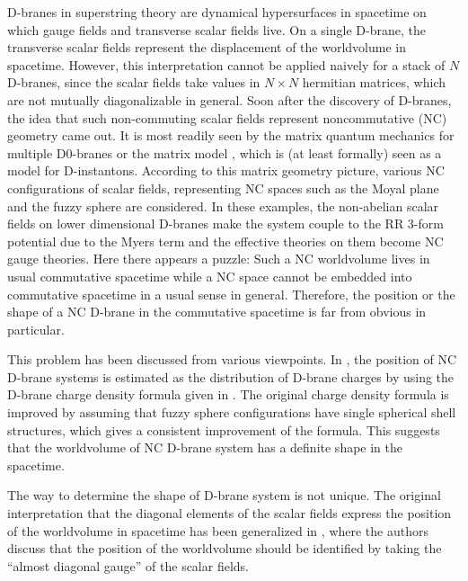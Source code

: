 \documentclass[12pt]{article}
\numberwithin{equation}{section}
\newcommand{\rc}[1]{\textcolor{red}{#1}}
\begin{document}
D-branes in superstring theory are dynamical hypersurfaces in spacetime
on which gauge fields and transverse scalar fields live. 
On a single D-brane, the transverse scalar fields represent the displacement of the worldvolume in spacetime.
However, this interpretation cannot be applied naively for a stack of $N$ D-branes, 
since the scalar fields take values in $N\times N$ hermitian matrices,
which are not mutually diagonalizable in general.
Soon after the discovery of D-branes, 
the idea that such non-commuting scalar fields represent noncommutative (NC) geometry \cite{Witten1996,Connes1997} came out.
It is most readily seen 
by the matrix quantum mechanics for multiple D0-branes \cite{Banks1996}
or the matrix model \cite{Ishibashi1996}, 
which is (at least formally) seen as a model for D-instantons.
According to this matrix geometry picture, 
various NC configurations of scalar fields, representing 
NC spaces such as the Moyal plane {\cite{Aoki2000}} and the fuzzy sphere \cite{Myers1999} are considered.
In these examples, the non-abelian scalar fields on 
lower dimensional D-branes make the system couple to the RR 3-form
potential due to the Myers term
and the effective theories on them become NC gauge theories. 
Here there appears a puzzle: 
Such a NC worldvolume lives in usual commutative spacetime
while a NC space cannot be embedded into commutative spacetime 
in a usual sense in general. 
Therefore, the position or the shape of a NC D-brane 
in the commutative spacetime is far from obvious in particular. 


This problem has been discussed from various {viewpoints}. 
In {\cite{Hashimoto2004}}, the position of NC D-brane systems 
is estimated as the distribution of D-brane charges by using 
the D-brane charge density formula given in \cite{Taylor1999,Taylor1999a}.
The original charge density formula is improved 
by assuming that fuzzy sphere configurations
have single spherical shell structures, 
which gives a consistent improvement of the formula. 
This suggests that the worldvolume of NC D-brane system has a definite 
shape in the spacetime.


The way to determine the shape of D-brane system is not unique. 
The original interpretation that the diagonal elements of the scalar fields 
express the position of the worldvolume in spacetime 
has been generalized in \cite{Azeyanagi2009},
where the authors discuss that the position of the worldvolume should be 
identified by taking the ``almost diagonal gauge''  \cite{Hotta1998}
of the scalar fields. 
\end{document}
